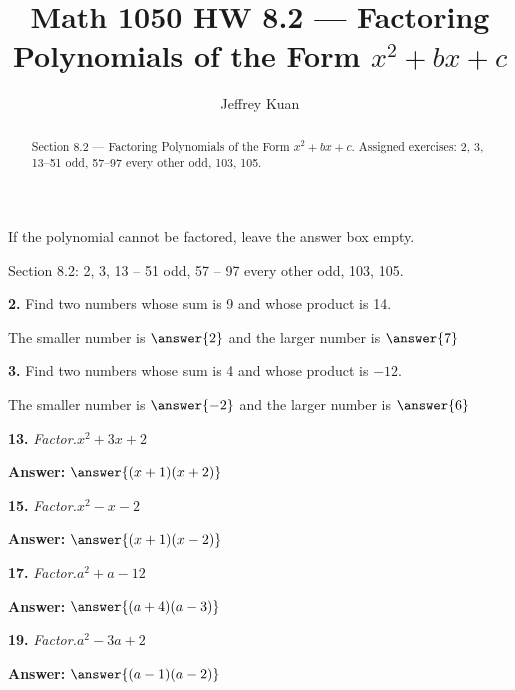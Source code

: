 \documentclass{ximera}
\author{Jeffrey Kuan}
\title{Math 1050 HW 8.2 --- Factoring Polynomials of the Form $x^2 + bx + c$}
\begin{document}
\begin{abstract}
    Section 8.2 --- Factoring Polynomials of the Form $x^2 + bx + c$.
    Assigned exercises: 2, 3, 13–51 odd, 57–97 every other odd, 103, 105.
\end{abstract}

\maketitle

If the polynomial cannot be factored, leave the answer box empty.

Section 8.2: 2, 3, 13 – 51 odd, 57 – 97 every other odd, 103, 105. %

\begin{problem}
\textbf{2.} Find two numbers whose sum is 9 and whose product is 14.

The smaller number is $\answer{2}$ and the larger number is $\answer{7}$
\end{problem}

\begin{problem}
\textbf{3.} Find two numbers whose sum is 4 and whose product is $-12$.

The smaller number is $\answer{-2}$ and the larger number is $\answer{6}$
\end{problem}

\begin{problem}
\textbf{13.} \emph{Factor.}\quad $x^2 + 3x + 2$

\textbf{Answer:} $\answer{(x +1)(x +2)}$
\end{problem}

\begin{problem}
\textbf{15.} \emph{Factor.}\quad $x^2 - x - 2$

\textbf{Answer:} $\answer{(x +1)(x -2)}$
\end{problem}

\begin{problem}
\textbf{17.} \emph{Factor.}\quad $a^2 + a - 12$

\textbf{Answer:} $\answer{(a +4)(a -3)}$
\end{problem}

\begin{problem}
\textbf{19.} \emph{Factor.}\quad $a^2 - 3a + 2$

\textbf{Answer:} $\answer{(a -1)(a -2)}$
\end{problem}
\end{document}
